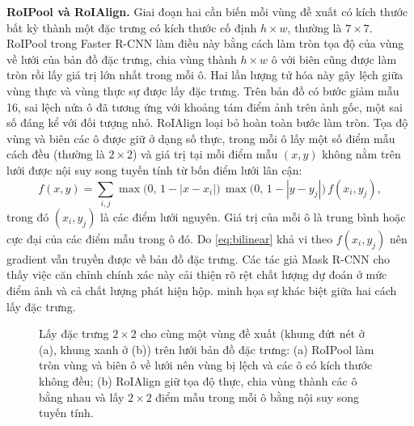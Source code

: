 \textbf{RoIPool và RoIAlign.} Giai đoạn hai cần biến mỗi vùng đề xuất có kích thước bất kỳ thành một đặc trưng có kích thước cố định $h \times w$, thường là $7 \times 7$. RoIPool trong Faster R-CNN làm điều này bằng cách làm tròn tọa độ của vùng về lưới của bản đồ đặc trưng, chia vùng thành $h \times w$ ô với biên cũng được làm tròn rồi lấy giá trị lớn nhất trong mỗi ô. Hai lần lượng tử hóa này gây lệch giữa vùng thực và vùng thực sự được lấy đặc trưng. Trên bản đồ có bước giảm mẫu 16, sai lệch nửa ô đã tương ứng với khoảng tám điểm ảnh trên ảnh gốc, một sai số đáng kể với đối tượng nhỏ. RoIAlign \cite{he2017maskrcnn} loại bỏ hoàn toàn bước làm tròn. Tọa độ vùng và biên các ô được giữ ở dạng số thực, trong mỗi ô lấy một số điểm mẫu cách đều (thường là $2 \times 2$) và giá trị tại mỗi điểm mẫu $(x, y)$ không nằm trên lưới được nội suy song tuyến tính từ bốn điểm lưới lân cận:
\begin{equation}
f(x, y) = \sum_{i,j} \max\big(0,\, 1 - |x - x_i|\big)\,\max\big(0,\, 1 - |y - y_j|\big)\, f(x_i, y_j),
\label{eq:bilinear}
\end{equation}
trong đó $(x_i, y_j)$ là các điểm lưới nguyên. Giá trị của mỗi ô là trung bình hoặc cực đại của các điểm mẫu trong ô đó. Do \cref{eq:bilinear} khả vi theo $f(x_i, y_j)$ nên gradient vẫn truyền được về bản đồ đặc trưng. Các tác giả Mask R-CNN cho thấy việc căn chỉnh chính xác này cải thiện rõ rệt chất lượng dự đoán ở mức điểm ảnh và cả chất lượng phát hiện hộp.  minh họa sự khác biệt giữa hai cách lấy đặc trưng.

\begin{figure}[htbp]
\centering
{}
\caption[So sánh RoIPool và RoIAlign]{Lấy đặc trưng $2 \times 2$ cho cùng một vùng đề xuất (khung đứt nét ở (a), khung xanh ở (b)) trên lưới bản đồ đặc trưng: (a) RoIPool làm tròn vùng và biên ô về lưới nên vùng bị lệch và các ô có kích thước không đều; (b) RoIAlign giữ tọa độ thực, chia vùng thành các ô bằng nhau và lấy $2 \times 2$ điểm mẫu trong mỗi ô bằng nội suy song tuyến tính.}
\label{fig:roialign}
\end{figure}

